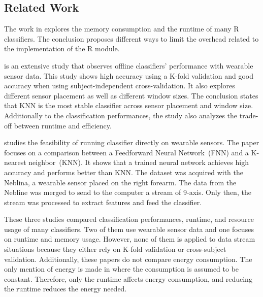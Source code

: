 

\subsection{Related Work}
The work in \cite{memory_consumption_machine_learning}
explores the memory consumption and
the runtime of many R classifiers. The conclusion proposes different ways to
limit the overhead related to the implementation of the R module.

\cite{Janidarmian_2017} is an extensive study that
observes offline classifiers' performance with
wearable sensor data. This study shows high
accuracy using a K-fold validation and good
accuracy when using subject-independent
cross-validation. It also explores different
sensor placement as well as different window
sizes. The conclusion states that KNN is the most
stable classifier across sensor placement and
window size. Additionally to the classification
performances, the study also analyzes the
trade-off between runtime and efficiency.

\cite{omid_2019} studies the feasibility of
running classifier directly on wearable sensors.
The paper focuses on a comparison between a
Feedforward Neural Network~(FNN) and a K-nearest
neighbor~(KNN). It shows that a trained neural
network achieves high accuracy and performs better
than KNN. The dataset was acquired with the
Neblina, a wearable sensor placed on the right
forearm. The data from the Nebline was merged to
send to the computer a stream of 9-axis. Only
then, the stream was processed to extract features
and feed the classifier.

These three studies compared classification
performances, runtime, and resource usage of many
classifiers. Two of them use wearable sensor data
and one focuses on runtime and memory usage.
However, none of them is applied to data stream
situations because they either rely on K-fold
validation or cross-subject validation.
Additionally, these papers do not compare energy
consumption. The only mention of energy is made in
\cite{omid_2019} where the consumption is assumed to be
constant. Therefore, only the runtime affects 
energy consumption, and reducing the runtime
reduces the energy needed.


